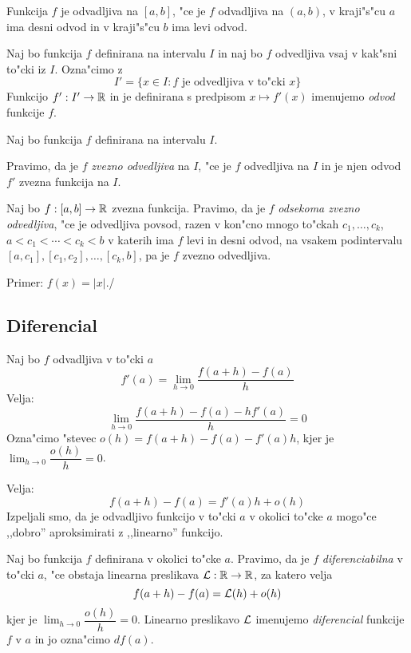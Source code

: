 Funkcija $f$ je odvadljiva na $[a, b]$, "ce je $f$ odvadljiva na $(a, b)$, v kraji"s"cu $a$ ima desni odvod in v kraji"s"cu $b$ ima levi odvod.

 Naj bo funkcija $f$ definirana na intervalu $I$ in naj bo $f$ odvedljiva vsaj v kak"sni to"cki iz $I$. Ozna"cimo z
\begin{equation*}
I' = \{x \in I: f \text{ je odvedljiva v to"cki $x$}\}
\end{equation*}
Funkcijo $f': I' \to \mathbb{R}$ in je definirana s predpisom $x \mapsto f'(x)$ imenujemo \emph{odvod} funkcije $f$.

 Naj bo funkcija $f$ definirana na intervalu $I$.

Pravimo, da je $f$ \emph{zvezno odvedljiva} na $I$, "ce je $f$ odvedljiva na $I$ in je njen odvod $f'$ zvezna funkcija na $I$.

 Naj bo $f: [a, b] \to \mathbb{R}$ zvezna funkcija. Pravimo, da je $f$ \emph{odsekoma zvezno odvedljiva}, "ce je odvedljiva povsod, razen v kon"cno mnogo to"ckah $c_1, \ldots, c_k$, $a < c_1 < \cdots < c_k < b$ v katerih ima $f$ levi in desni odvod, na vsakem podintervalu $[a, c_1], [c_1, c_2], \ldots, [c_k, b]$, pa je $f$ zvezno odvedljiva.

Primer: $f(x) = |x|$./
%
\subsection{Diferencial}
Naj bo $f$ odvadljiva v to"cki $a$
\begin{equation*}
f'(a) = \lim_{h \to 0} \dfrac{f(a + h) - f(a)}{h}
\end{equation*}
Velja:
\begin{equation*}
\lim_{h \to 0} \dfrac{f(a + h) - f(a) - h f'(a)}{h} = 0
\end{equation*}
Ozna"cimo "stevec $o(h) = f(a+h) - f(a) - f'(a) h$, kjer je $\lim_{h \to 0} \dfrac{o(h)}{h} = 0$.

Velja:
\begin{equation*}
f(a+h) - f(a) = f'(a)h + o(h)
\end{equation*}
Izpeljali smo, da je odvadljivo funkcijo v to"cki $a$ v okolici to"cke $a$ mogo"ce ,,dobro'' aproksimirati z ,,linearno'' funkcijo.

 Naj bo funkcija $f$ definirana v okolici to"cke $a$. Pravimo, da je $f$ \emph{diferenciabilna} v to"cki $a$, "ce obstaja linearna preslikava $\operatorname{\mathcal{L}}: \mathbb{R} \to \mathbb{R}$, za katero velja
\begin{equation*}
f(a+h) - f(a) = \operatorname{\mathcal{L}}(h) + o(h)
\end{equation*}
kjer je $\lim_{h \to 0} \dfrac{o(h)}{h} = 0$. Linearno preslikavo $\operatorname{\mathcal{L}}$ imenujemo \emph{diferencial} funkcije $f$ v $a$ in jo ozna"cimo $df(a)$.

